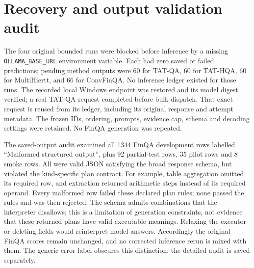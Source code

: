 \section{Recovery and output validation audit}
The four original bounded runs were blocked before inference by a missing
\texttt{OLLAMA\_BASE\_URL} environment variable. Each had zero saved or failed
predictions; pending method outputs were 60 for TAT-QA, 60 for TAT-HQA, 60 for
MultiHiertt, and 66 for ConvFinQA. No inference ledger existed for those runs.
The recorded local Windows endpoint was restored and its model digest verified;
a real TAT-QA request completed before bulk dispatch. That exact request is
reused from its ledger, including its original response and attempt metadata.
The frozen IDs, ordering, prompts, evidence cap, schema and decoding settings
were retained. No FinQA generation was repeated.

The saved-output audit examined all 1344 FinQA development rows labelled
``Malformed structured output'', plus 92 partial-test rows, 35 pilot rows and
8 smoke rows. All were valid JSON satisfying the broad response schema, but
violated the kind-specific plan contract. For example, table aggregation
omitted its required row, and extraction returned arithmetic steps instead of
its required operand. Every malformed row failed these declared plan rules;
none passed the rules and was then rejected. The schema admits combinations
that the interpreter disallows; this is a limitation of generation constraints,
not evidence that these returned plans have valid executable meanings.
Relaxing the executor or deleting fields would reinterpret model answers.
Accordingly the original FinQA scores remain unchanged, and no corrected
inference rerun is mixed with them. The generic error label obscures this
distinction; the detailed audit is saved separately.
